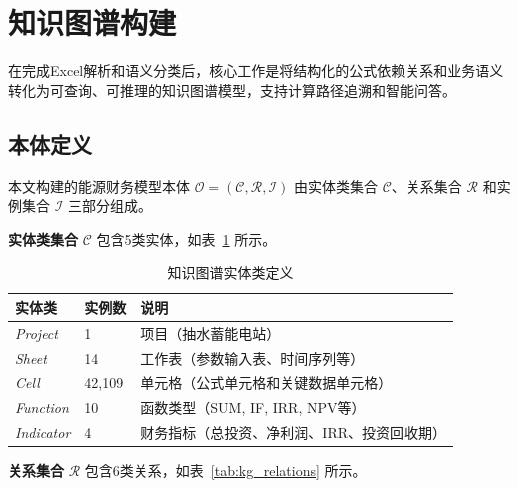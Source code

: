\section{\heiti 知识图谱构建}

在完成Excel解析和语义分类后，核心工作是将结构化的公式依赖关系和业务语义转化为可查询、可推理的知识图谱模型，支持计算路径追溯和智能问答。

\subsection{\heiti 本体定义}

本文构建的能源财务模型本体 $\mathcal{O} = (\mathcal{C}, \mathcal{R}, \mathcal{I})$ 由实体类集合 $\mathcal{C}$、关系集合 $\mathcal{R}$ 和实例集合 $\mathcal{I}$ 三部分组成。

\textbf{实体类集合} $\mathcal{C}$ 包含5类实体，如表~\ref{tab:kg_entities} 所示。

\begin{table}[H]
	\centering
	\caption{知识图谱实体类定义}
	\label{tab:kg_entities}
	\vspace {-2.5mm}
	\begin{center}
		\begin{tabular}{lll}
			\toprule
			实体类 & 实例数 & 说明 \\
			\hline
			\textit{Project} & 1 & 项目（抽水蓄能电站） \\
			\textit{Sheet} & 14 & 工作表（参数输入表、时间序列等） \\
			\textit{Cell} & 42,109 & 单元格（公式单元格和关键数据单元格） \\
			\textit{Function} & 10 & 函数类型（SUM, IF, IRR, NPV等） \\
			\textit{Indicator} & 4 & 财务指标（总投资、净利润、IRR、投资回收期） \\
			\bottomrule
		\end{tabular}
	\end{center}
\end{table}

\textbf{关系集合} $\mathcal{R}$ 包含6类关系，如表~\ref{tab:kg_relations} 所示。

